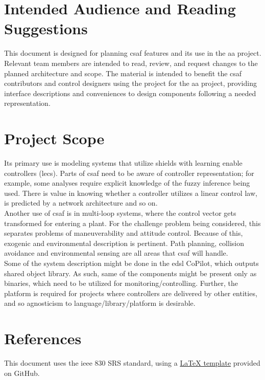 \section{Intended Audience and Reading Suggestions}

This document is designed for planning \acrshort{csaf} features and its use in the \acrlong{aa} project. 
Relevant team members are intended to read, review, and request changes to the planned architecture and 
scope. The material is intended to benefit the \acrshort{csaf} contributors and control designers using the 
project for the \acrlong{aa} project, providing interface descriptions and conveniences to design components 
following a needed representation.\\

\section{Project Scope}
Its primary use is modeling systems that utilize shields with learning enable controllers (\acrshort{lec}s). Parts 
of \acrshort{csaf} need to be aware of controller representation; for example, some analyses require explicit 
knowledge of the fuzzy inference being used. There is value in knowing whether a controller utilizes a linear 
control law, is predicted by a network architecture and so on.\\

Another use of \acrshort{csaf} is in multi-loop systems, where the control vector gets transformed for 
entering a plant. For the challenge problem being considered, this separates problems of maneuverability and 
attitude control. Because of this, exogenic and environmental description is pertinent. Path planning, collision 
avoidance and environmental sensing are all areas that \acrshort{csaf} will handle.\\

Some of the system description might be done in the \acrshort{edsl} CoPilot, which outputs shared object 
library. As such, same of the components might be present only as binaries, which need to be utilized for 
monitoring/controlling. Further, the platform is required for projects where controllers are delivered by other 
entities, and so agnosticism to language/library/platform is desirable. 

\section{References}

This document uses the \acrshort{ieee} 830 SRS standard, using a \href{https://github.com/jpeisenbarth/SRS-Tex}{\LaTeX{} template} provided on GitHub.  \\
